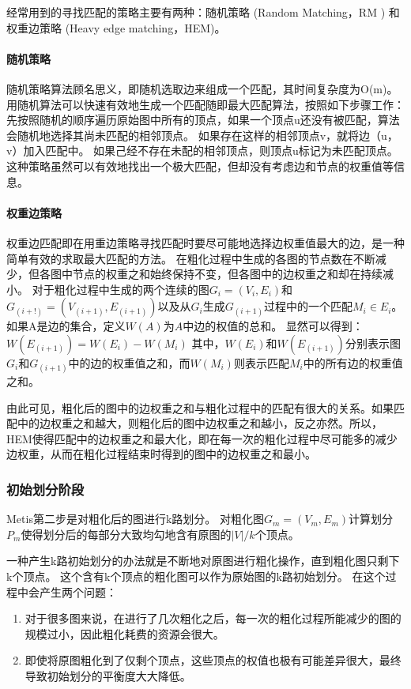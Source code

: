 经常用到的寻找匹配的策略主要有两种：随机策略 (Random Matching，RM ) 和权重边策略 (Heavy edge matching，HEM)。

\paragraph{随机策略}
随机策略算法顾名思义，即随机选取边来组成一个匹配，其时间复杂度为O(m)。
用随机算法可以快速有效地生成一个匹配随即最大匹配算法，按照如下步骤工作：
先按照随机的顺序遍历原始图中所有的顶点，如果一个顶点u还没有被匹配，算法会随机地选择其尚未匹配的相邻顶点。
如果存在这样的相邻顶点v，就将边（u，v）加入匹配中。
如果己经不存在未配的相邻顶点，则顶点u标记为未匹配顶点。
这种策略虽然可以有效地找出一个极大匹配，但却没有考虑边和节点的权重值等信息。

\paragraph{权重边策略}
权重边匹配即在用重边策略寻找匹配时要尽可能地选择边权重值最大的边，是一种简单有效的求取最大匹配的方法。
在粗化过程中生成的各图的节点数在不断减少，但各图中节点的权重之和始终保持不变，但各图中的边权重之和却在持续减小。
对于粗化过程中生成的两个连续的图$G_i=(V_i,E_i)$和$G_(i+!)=(V_(i+1),E_(i+1))$以及从$G_i$生成$G_(i+1)$过程中的一个匹配$M_i \in E_i$。
如果A是边的集合，定义$W(A)$为$A$中边的权值的总和。
显然可以得到：$W(E_(i+1) )=W(E_i )-W(M_i )$
其中，$W(E_i)$和$W(E_(i+1))$分别表示图$G_i$和$G_(i+1)$中的边的权重值之和，而$W(M_i)$则表示匹配$M_i$中的所有边的权重值之和。

由此可见，粗化后的图中的边权重之和与粗化过程中的匹配有很大的关系。如果匹配中的边权重之和越大，则粗化后的图中边权重之和越小，反之亦然。所以，HEM使得匹配中的边权重之和最大化，即在每一次的粗化过程中尽可能多的减少边权重，从而在粗化过程结束时得到的图中的边权重之和最小。

\subsubsection{初始划分阶段}

Metis第二步是对粗化后的图进行k路划分。
对粗化图$G_m=(V_m,E_m)$计算划分$P_m$使得划分后的每部分大致均勾地含有原图的$|V|/k$个顶点。

一种产生k路初始划分的办法就是不断地对原图进行粗化操作，直到粗化图只剩下k个顶点。
这个含有k个顶点的粗化图可以作为原始图的k路初始划分。
在这个过程中会产生两个问题：
\begin{enumerate}
    \item 对于很多图来说，在进行了几次粗化之后，每一次的粗化过程所能减少的图的规模过小，因此粗化耗费的资源会很大。
    \item 即使将原图粗化到了仅剩个顶点，这些顶点的权值也极有可能差异很大，最终导致初始划分的平衡度大大降低。
\end{enumerate}

